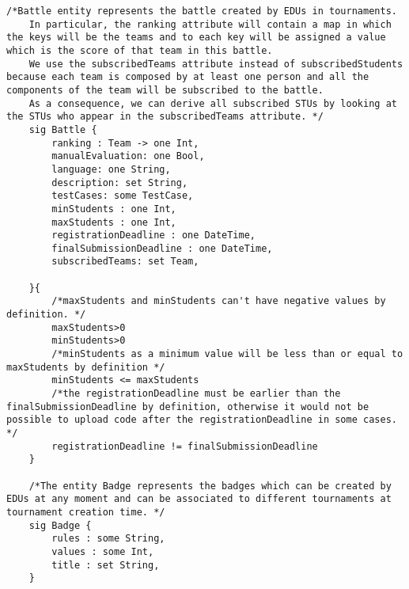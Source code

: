 \begin{lstlisting}[language=Alloy,  label={lst:alloycode}, basicstyle=\fontfamily{Roboto}\selectfont\ttfamily]
    /*Battle entity represents the battle created by EDUs in tournaments.
    In particular, the ranking attribute will contain a map in which the keys will be the teams and to each key will be assigned a value which is the score of that team in this battle.
    We use the subscribedTeams attribute instead of subscribedStudents because each team is composed by at least one person and all the components of the team will be subscribed to the battle. 
    As a consequence, we can derive all subscribed STUs by looking at the STUs who appear in the subscribedTeams attribute. */
    sig Battle {
        ranking : Team -> one Int,
        manualEvaluation: one Bool,
        language: one String,
        description: set String,
        testCases: some TestCase,
        minStudents : one Int,
        maxStudents : one Int,
        registrationDeadline : one DateTime,
        finalSubmissionDeadline : one DateTime,
        subscribedTeams: set Team,

    }{
        /*maxStudents and minStudents can't have negative values by definition. */
        maxStudents>0
        minStudents>0 
        /*minStudents as a minimum value will be less than or equal to maxStudents by definition */
        minStudents <= maxStudents
        /*the registrationDeadline must be earlier than the finalSubmissionDeadline by definition, otherwise it would not be possible to upload code after the registrationDeadline in some cases. */
        registrationDeadline != finalSubmissionDeadline 
    }

    /*The entity Badge represents the badges which can be created by EDUs at any moment and can be associated to different tournaments at tournament creation time. */
    sig Badge {
        rules : some String,
        values : some Int,
        title : set String,
    }

        \end{lstlisting}
